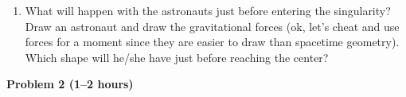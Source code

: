 \begin{multicols}{2}
\begin{enumerate}
{\bf Important hint:} You cannot use the result given in the text. Check that you understand why and find the correct result. In the end you will need to do an ugly integral. Go to 'The Integrator' (\url{http://integrals.wolfram.com/index.jsp}) and type
\[
\verb!1/sqrt(a+b/x)!.
\]

\item What will happen with the astronauts just before entering the singularity? Draw an astronaut and draw the gravitational forces (ok, let's cheat and use forces for a moment since they are easier to draw than spacetime geometry). Which shape will he/she have just before reaching the center?
\end{enumerate}

\vspace{0.5cm}

{\bf Problem 2 (1--2 hours)}


\end{multicols}
